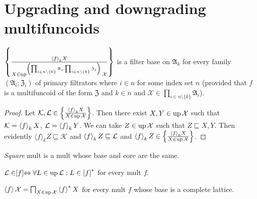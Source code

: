 \section{Upgrading and downgrading multifuncoids}
\begin{lem}
\label{mf-f-base}$\left\{ \frac{\left\langle f\right\rangle_{k}X}{X\in\operatorname{up}^{\left(\prod_{i\in n\setminus\{k\}}\mathfrak{A}_{i};\prod_{i\in n\setminus\{k\}}\mathfrak{Z}_{i}\right)}\mathcal{X}}\right\}$
is a filter base on $\mathfrak{A}_{k}$ for every family $(\mathfrak{A}_{i};\mathfrak{Z}_{i})$
of primary filtrators where $i\in n$ for some index set $n$ (provided that
$f$ is a multifuncoid of the form $\mathfrak{Z}$ and $k\in n$ and
$\mathcal{X}\in\prod_{i\in n\setminus\{k\}}\mathfrak{A}_{i}$).\end{lem}
\begin{proof}
Let $\mathcal{K},\mathcal{L}\in\left\{ \frac{\left\langle f\right\rangle_{k}X}{X\in\operatorname{up}\mathcal{X}}\right\}$.
Then there exist $X,Y\in\operatorname{up}\mathcal{X}$ such that $\mathcal{K}=\left\langle f\right\rangle_{k}X$,
$\mathcal{L}=\left\langle f\right\rangle_{k}Y$. We can take $Z\in\operatorname{up}\mathcal{X}$ such
that $Z\sqsubseteq X,Y$. Then evidently $\langle f\rangle_{k}Z\sqsubseteq\mathcal{K}$
and $\left\langle f\right\rangle_{k}Z\sqsubseteq\mathcal{L}$ and $\left\langle f\right\rangle_{k}Z\in\left\{ \frac{\left\langle f\right\rangle_{k}X}{X\in\operatorname{up}\mathcal{X}}\right\}$.\end{proof}
\begin{defn}
\emph{Square} mult is a mult whose base and core are the same.
\end{defn}

\begin{defn}
$\mathcal{L}\in\mathrel{\left[f\right]}\Leftrightarrow\forall L\in\operatorname{up}\mathcal{L}:L\in\mathord{\mathrel{\left[f\right]^{\ast}}}$
for every mult $f$.
\end{defn}

\begin{defn}
$\left\langle f\right\rangle\mathcal{X}=\bigsqcap_{X\in\operatorname{up}\mathcal{X}}\left\langle f\right\rangle ^{\ast}X$
for every mult $f$ whose base is a complete lattice.
\end{defn}

